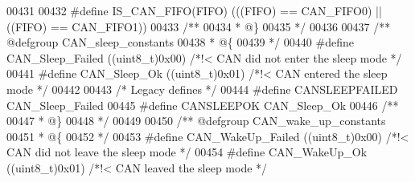 \begin{DoxyCode}
00431 
00432 \textcolor{preprocessor}{#}\textcolor{preprocessor}{define} \textcolor{preprocessor}{IS\_CAN\_FIFO}\textcolor{preprocessor}{(}\textcolor{preprocessor}{FIFO}\textcolor{preprocessor}{)} \textcolor{preprocessor}{(}\textcolor{preprocessor}{(}\textcolor{preprocessor}{(}\textcolor{preprocessor}{FIFO}\textcolor{preprocessor}{)} \textcolor{preprocessor}{==} CAN_FIFO0\textcolor{preprocessor}{)} \textcolor{preprocessor}{||} \textcolor{preprocessor}{(}\textcolor{preprocessor}{(}\textcolor{preprocessor}{FIFO}\textcolor{preprocessor}{)} \textcolor{preprocessor}{==} CAN_FIFO1\textcolor{preprocessor}{)}\textcolor{preprocessor}{)}
00433 \textcolor{comment}{/**}
00434 \textcolor{comment}{  * @\}}
00435 \textcolor{comment}{  */}
00436 
00437 \textcolor{comment}{/** @defgroup CAN\_sleep\_constants }
00438 \textcolor{comment}{  * @\{}
00439 \textcolor{comment}{  */}
00440 \textcolor{preprocessor}{#}\textcolor{preprocessor}{define} \textcolor{preprocessor}{CAN\_Sleep\_Failed}     \textcolor{preprocessor}{(}\textcolor{preprocessor}{(}\textcolor{preprocessor}{uint8\_t}\textcolor{preprocessor}{)}0x00\textcolor{preprocessor}{)} \textcolor{comment}{/*!< CAN did not enter the sleep mode */}
00441 \textcolor{preprocessor}{#}\textcolor{preprocessor}{define} \textcolor{preprocessor}{CAN\_Sleep\_Ok}         \textcolor{preprocessor}{(}\textcolor{preprocessor}{(}\textcolor{preprocessor}{uint8\_t}\textcolor{preprocessor}{)}0x01\textcolor{preprocessor}{)} \textcolor{comment}{/*!< CAN entered the sleep mode */}
00442 
00443 \textcolor{comment}{/* Legacy defines */}
00444 \textcolor{preprocessor}{#}\textcolor{preprocessor}{define} \textcolor{preprocessor}{CANSLEEPFAILED}   CAN_Sleep_Failed
00445 \textcolor{preprocessor}{#}\textcolor{preprocessor}{define} \textcolor{preprocessor}{CANSLEEPOK}       CAN_Sleep_Ok
00446 \textcolor{comment}{/**}
00447 \textcolor{comment}{  * @\}}
00448 \textcolor{comment}{  */}
00449 
00450 \textcolor{comment}{/** @defgroup CAN\_wake\_up\_constants }
00451 \textcolor{comment}{  * @\{}
00452 \textcolor{comment}{  */}
00453 \textcolor{preprocessor}{#}\textcolor{preprocessor}{define} \textcolor{preprocessor}{CAN\_WakeUp\_Failed}        \textcolor{preprocessor}{(}\textcolor{preprocessor}{(}\textcolor{preprocessor}{uint8\_t}\textcolor{preprocessor}{)}0x00\textcolor{preprocessor}{)} \textcolor{comment}{/*!< CAN did not leave the sleep mode */}
00454 \textcolor{preprocessor}{#}\textcolor{preprocessor}{define} \textcolor{preprocessor}{CAN\_WakeUp\_Ok}            \textcolor{preprocessor}{(}\textcolor{preprocessor}{(}\textcolor{preprocessor}{uint8\_t}\textcolor{preprocessor}{)}0x01\textcolor{preprocessor}{)} \textcolor{comment}{/*!< CAN leaved the sleep mode */}

\end{DoxyCode}
